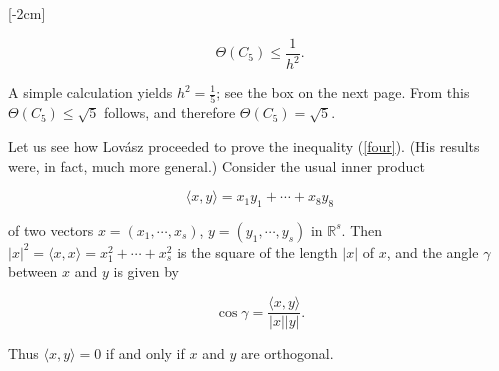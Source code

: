 [-2cm]

\begin{equation}
  \Theta(C_5) \leq \frac{1}{h^2}. \label{four}
\end{equation}

A simple calculation yields $h^2 = \frac{1}{5}$; see the box on the next page. From   
this $\Theta(C_5) \leq \sqrt{5}$ follows, and therefore $\Theta(C_5) = \sqrt{5}$.


\setnewpagemargins

Let us see how Lov\'asz proceeded to prove the inequality (\ref{four}). (His results 
were, in fact, much more general.) Consider the usual inner product 

\begin{equation*}
  \langle x,y \rangle = x_1y_1 + \dotsb + x_8y_8
\end{equation*}

of two vectors $x = (x_1, \dotsb, x_s)$, $y = (y_1, \dotsb, y_s)$ in $\mathbb{R}^s$.
Then $|x|^2 = \langle x,x \rangle = x_1^2 + \dotsb + x_s^2$ is the square of the length $|x|$
of $x$, and the angle $\gamma$ between $x$ and $y$ is given by

\begin{equation*}
  \cos \gamma = \frac{\langle x,y \rangle}{|x||y|}.
\end{equation*}

Thus $\langle x,y \rangle = 0$ if and only if $x$ and $y$ are orthogonal.\\

